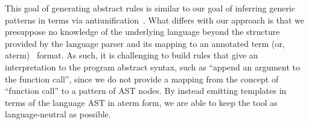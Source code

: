 This goal of generating abstract rules is similar to our goal of inferring
generic patterns in terms via
antiunification~\cite{reynolds70antiunification,plotkin70antiunification}.
What differs with our approach is that we presuppose no knowledge of the
underlying language beyond the structure provided by the language parser and
its mapping to an annotated term (or, aterm)~\cite{brand00aterm} format.  As
such, it is challenging to build rules that give an interpretation to the
program abstract syntax, such as ``append an argument to the function call'',
since we do not provide a mapping from the concept of ``function call'' to a
pattern of AST nodes.  By instead emitting templates in terms of the language
AST in aterm form, we are able to keep the tool as language-neutral as
possible.
